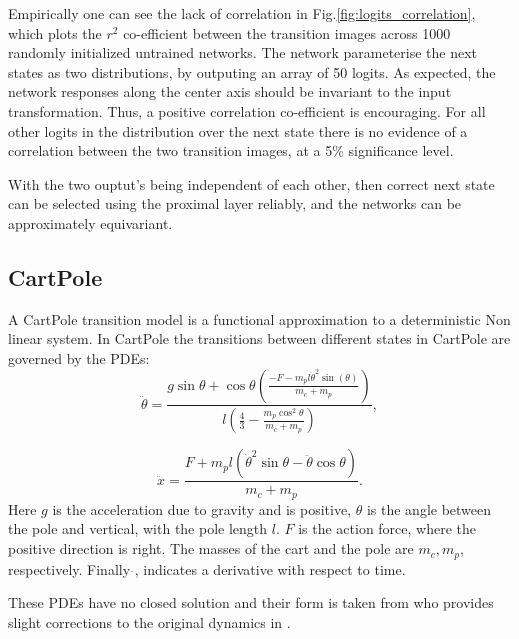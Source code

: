 Empirically one can see the lack of correlation in Fig.\ref{fig:logits_correlation}, which plots the $r^2$ co-efficient between the transition images across 1000 randomly initialized untrained networks. The network parameterise the next states as two distributions, by outputing an array of 50 logits. As expected, the network responses along the center axis should be invariant to the input transformation. Thus, a positive correlation co-efficient is encouraging. For all other logits in the distribution over the next state there is no evidence of a correlation between the two transition images, at a 5\% significance level.

With the two ouptut's being independent of each other, then correct next state can be selected using the proximal layer reliably, and the networks can be approximately equivariant.



\subsection{CartPole}
A CartPole transition model is a functional approximation to a deterministic Non linear system. In CartPole the transitions between different states in CartPole are governed by the PDEs:
\begin{equation}
	\ddot{\theta} = \frac{g \sin \theta + \cos\theta \left({\frac{-F - m_p l \dot{\theta}^2 \sin(\theta)}{m_c + m_p}} \right )}{l\left ( \frac{4}{3} - \frac{m_p \cos^2 \theta}{m_c + m_p}\right)},
\end{equation}

\begin{equation}
	\ddot{x} = \frac{ F + m_p l (\dot{\theta}^2 \sin \theta - \ddot{\theta} \cos \theta)}{m_c + m_p}.
\end{equation}
Here $g$ is the acceleration due to gravity and is positive, $\theta$ is the angle between the pole and vertical, with the pole length $l$. $F$ is the action force, where the positive direction is right. The masses of the cart and the pole are $m_c, m_p$, respectively. Finally $\dot{}$, indicates a derivative with respect to time.

These PDEs have no closed solution and their form is taken from \cite{florian2007correct} who provides slight corrections to the original dynamics in \cite{barto1983neuronlike}.

